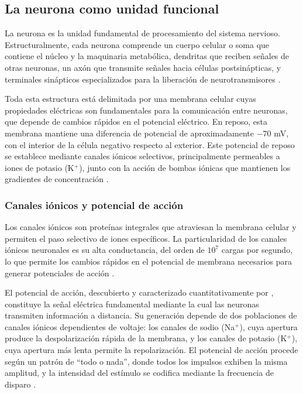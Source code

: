 \subsection{La neurona como unidad funcional}
\label{subsec:neurona_unidad}

La neurona es la unidad fundamental de procesamiento del sistema nervioso. Estructuralmente, cada neurona comprende un cuerpo celular o soma que contiene el núcleo y la maquinaria metabólica, dendritas que reciben señales de otras neuronas, un axón que transmite señales hacia células postsinápticas, y terminales sinápticos especializados para la liberación de neurotransmisores \citep{dayan2005theoretical}.

Toda esta estructura está delimitada por una membrana celular cuyas propiedades eléctricas son fundamentales para la comunicación entre neuronas, que depende de cambios rápidos en el potencial eléctrico. En reposo, esta membrana mantiene una diferencia de potencial de aproximadamente $-70$ mV, con el interior de la célula negativo respecto al exterior. Este potencial de reposo se establece mediante canales iónicos selectivos, principalmente permeables a iones de potasio (K$^+$), junto con la acción de bombas iónicas que mantienen los gradientes de concentración \citep{dayan2005theoretical}.

\subsubsection{Canales iónicos y potencial de acción}

Los canales iónicos son proteínas integrales que atraviesan la membrana celular y permiten el paso selectivo de iones específicos. La particularidad de los canales iónicos neuronales es su alta conductancia, del orden de $10^7$ cargas por segundo, lo que permite los cambios rápidos en el potencial de membrana necesarios para generar potenciales de acción \citep{dayan2005theoretical}.

El potencial de acción, descubierto y caracterizado cuantitativamente por \citet{hodgkin1952quantitative}, constituye la señal eléctrica fundamental mediante la cual las neuronas transmiten información a distancia. Su generación depende de dos poblaciones de canales iónicos dependientes de voltaje: los canales de sodio (Na$^+$), cuya apertura produce la despolarización rápida de la membrana, y los canales de potasio (K$^+$), cuya apertura más lenta permite la repolarización. El potencial de acción procede según un patrón de ``todo o nada'', donde todos los impulsos exhiben la misma amplitud, y la intensidad del estímulo se codifica mediante la frecuencia de disparo \citep{dayan2005theoretical}.

